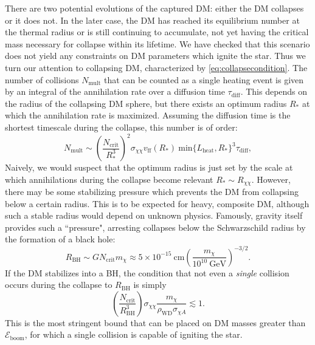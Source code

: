 \documentclass[preprintnumbers,amsmath,amssymb,prd,superscriptaddress]{revtex4}
\newcommand{\Eboom}{\mathcal{E}_\text{boom}}
\newcommand{\GeV}{\text{GeV}}
\newcommand{\cm}{\text{cm}}
\def\r{\right)}
\def\l{\left(}
\begin{document}
There are two potential evolutions of the captured DM: either the DM collapses or it does not. 
In the later case, the DM has reached its equilibrium number at the thermal radius or is still continuing to accumulate, not yet having the critical mass necessary for collapse within its lifetime.
We have checked that this scenario does not yield any constraints on DM parameters which ignite the star. 
Thus we turn our attention to collapsing DM, characterized by \eqref{eq:collapsecondition}. 
The number of collisions $N_\text{mult}$ that can be counted as a single heating event is given by an integral of the annihilation rate over a diffusion time $\tau_\text{diff}$.
This depends on the radius of the collapsing DM sphere, but there exists an optimum radius $R_*$ at which the annihilation rate is maximized.
Assuming the diffusion time is the shortest timescale during the collapse, this number is of order:
\begin{equation}
\label{eq:nmulti}
N_\text{mult} \sim \l \frac{N_\text{crit}}{R_*^3}\r^2  \sigma_{\chi \chi} v_\text{ff}(R_*) ~\text{min}\{L_\text{heat}, R_*\}^3 \tau_\text{diff},
\end{equation}
Naively, we would suspect that the optimum radius is just set by the scale at which annihilations during the collapse become relevant $R_* \sim R_{\chi \chi}$. 
However, there may be some stabilizing pressure which prevents the DM from collapsing below a certain radius.
This is to be expected for heavy, composite DM, although such a stable radius would depend on unknown physics. 
Famously, gravity itself provides such a ``pressure", arresting collapses below the Schwarzschild radius by the formation of a black hole:
\begin{equation}
R_\text{BH} \sim G N_\text{crit} m_\chi \approx 5 \times 10^{-15} ~\cm \l \frac{m_\chi}{10^{10} ~\GeV} \r^{-3/2}.
\end{equation}
If the DM stabilizes into a BH, the condition that not even a \emph{single} collision occurs during the collapse to $R_\text{BH}$ is simply
\begin{equation}
\l \frac{N_\text{crit}}{R_\text{BH}^3}\r \sigma_{\chi \chi} \frac{m_\chi}{\rho_\text{WD} \sigma_{\chi A}} \lesssim 1. 
\end{equation}
This is the most stringent bound that can be placed on DM masses greater than $\Eboom$, for which a single collision is capable of igniting the star. 
\end{document}
